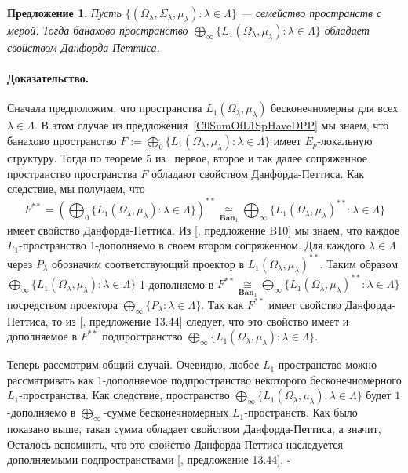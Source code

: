 \documentclass[12pt]{article}
\newcommand{\isom}[1]{\mathop{\mathbin{\cong}}\limits_{#1}}
\newtheorem{proposition}[theorem]{Предложение}
\renewenvironment{proof}{\paragraph{Доказательство.}}{\hfill$\square$\medskip}
\begin{document}
\begin{proposition}\label{ProdOfL1SpHaveDPP} Пусть $
        \{(\Omega_\lambda,\Sigma_\lambda,\mu_\lambda):\lambda\in\Lambda \}$ ---
    семейство пространств с мерой. Тогда банахово пространство
    $\bigoplus_\infty \{L_1(\Omega_\lambda,\mu_\lambda):\lambda\in\Lambda
        \}$ обладает свойством Данфорда-Петтиса.
\end{proposition}
\begin{proof} Сначала предположим, что пространства $L_1(\Omega_\lambda,
        \mu_\lambda)$ бесконечномерны для всех $\lambda\in\Lambda$. В этом
    случае из предложения~\ref{C0SumOfL1SpHaveDPP} мы знаем, что банахово
    пространство $F:=\bigoplus_0
        \{L_1(\Omega_\lambda,\mu_\lambda):\lambda\in\Lambda \}$ имеет
    $E_{p}$-локальную структуру. Тогда по теореме 5 из~\cite{BourgOnTheDPP}
    первое, второе и так далее сопряженное пространство пространства $F$
    обладают свойством Данфорда-Петтиса. Как следствие, мы получаем, что
    $$
        F^{**}={\left(
                \bigoplus_0 \{L_1(\Omega_\lambda,\mu_\lambda):\lambda\in\Lambda \}
                \right)}^{**}
        \isom{\mathbf{Ban}_1}\bigoplus_\infty
        \{{L_1(\Omega_\lambda,\mu_\lambda)}^{**}:\lambda\in\Lambda \}
    $$
    имеет свойство Данфорда-Петтиса. Из [\cite{DefFloTensNorOpId}, предложение
    B10] мы знаем, что каждое $L_1$-пространство 1-дополняемо в своем втором
    сопряженном. Для каждого $\lambda\in\Lambda$ через $P_\lambda$ обозначим
    соответствующий проектор в ${L_1(\Omega_\lambda,\mu_\lambda)}^{**}$. Таким
    образом $\bigoplus_\infty
        \{L_1(\Omega_\lambda,\mu_\lambda):\lambda\in\Lambda \}$ 1-дополняемо в
    $F^{**}\isom{\mathbf{Ban}_1}\bigoplus_\infty
        \{{L_1(\Omega_\lambda,\mu_\lambda)}^{**}:\lambda\in\Lambda \}$ посредством
    проектора $\bigoplus_\infty  \{P_\lambda:\lambda\in\Lambda \}$. Так как
    $F^{**}$ имеет свойство Данфорда-Петтиса, то из [\cite{FabHabBanSpTh},
    предложение 13.44] следует, что это свойство имеет и дополняемое в $F^{**}$
    подпространство $\bigoplus_\infty
        \{L_1(\Omega_\lambda,\mu_\lambda):\lambda\in\Lambda \}$.

    Теперь рассмотрим общий случай. Очевидно, любое $L_1$-пространство можно
    рассматривать как $1$-дополняемое подпространство некоторого
    бесконечномерного $L_1$-пространства. Как следствие, пространство
    $\bigoplus_\infty \{L_1(\Omega_\lambda,\mu_\lambda):\lambda\in\Lambda \}$
    будет $1$-дополняемо в $\bigoplus_\infty$-сумме бесконечномерных
    $L_1$-пространств. Как было показано выше, такая сумма обладает свойством
    Данфорда-Петтиса, а значит, Осталось вспомнить, что это свойство
    Данфорда-Петтиса наследуется дополняемыми подпространствами
    [\cite{FabHabBanSpTh}, предложение 13.44].
\end{proof}
\end{document}
